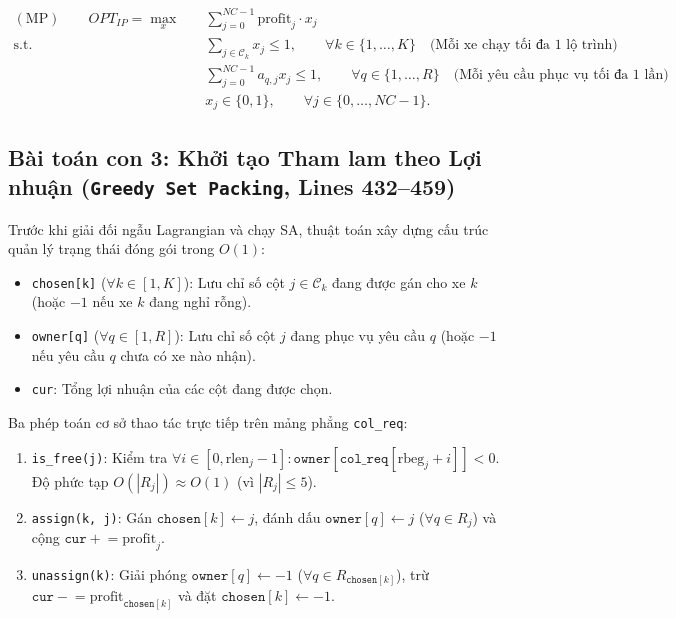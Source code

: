 \documentclass[11pt,a4paper]{article}
\theoremstyle{definition}
\begin{document}
\begin{align}
    (\text{MP}) \qquad OPT_{IP} = \max_{x} \quad & \sum_{j=0}^{NC-1} \text{profit}_j \cdot x_j \label{eq:mp_obj}\\
    \text{s.t.} \quad & \sum_{j \in \mathcal{C}_k} x_j \le 1, \qquad \forall k \in \{1, \dots, K\} \quad \text{(Mỗi xe chạy tối đa 1 lộ trình)} \label{eq:mp_veh}\\
    & \sum_{j=0}^{NC-1} a_{q, j} x_j \le 1, \qquad \forall q \in \{1, \dots, R\} \quad \text{(Mỗi yêu cầu phục vụ tối đa 1 lần)} \label{eq:mp_req}\\
    & x_j \in \{0, 1\}, \qquad \forall j \in \{0, \dots, NC-1\}. \label{eq:mp_bin}
\end{align}

\subsection{Bài toán con 3: Khởi tạo Tham lam theo Lợi nhuận (\texttt{Greedy Set Packing}, Lines 432--459)}
Trước khi giải đối ngẫu Lagrangian và chạy SA, thuật toán xây dựng cấu trúc quản lý trạng thái đóng gói trong $O(1)$:
\begin{itemize}[leftmargin=1.5em]
    \item \texttt{chosen[k]} ($\forall k \in [1, K]$): Lưu chỉ số cột $j \in \mathcal{C}_k$ đang được gán cho xe $k$ (hoặc $-1$ nếu xe $k$ đang nghỉ rỗng).
    \item \texttt{owner[q]} ($\forall q \in [1, R]$): Lưu chỉ số cột $j$ đang phục vụ yêu cầu $q$ (hoặc $-1$ nếu yêu cầu $q$ chưa có xe nào nhận).
    \item \texttt{cur}: Tổng lợi nhuận của các cột đang được chọn.
\end{itemize}
Ba phép toán cơ sở thao tác trực tiếp trên mảng phẳng \texttt{col\_req}:
\begin{enumerate}[leftmargin=1.5em]
    \item \texttt{is\_free(j)}: Kiểm tra $\forall i \in [0, \text{rlen}_j - 1]: \texttt{owner}[\texttt{col\_req}[\text{rbeg}_j + i]] < 0$. Độ phức tạp $O(|R_j|) \approx O(1)$ (vì $|R_j| \le 5$).
    \item \texttt{assign(k, j)}: Gán $\texttt{chosen}[k] \leftarrow j$, đánh dấu $\texttt{owner}[q] \leftarrow j$ ($\forall q \in R_j$) và cộng $\texttt{cur} \mathrel{+}= \text{profit}_j$.
    \item \texttt{unassign(k)}: Giải phóng $\texttt{owner}[q] \leftarrow -1$ ($\forall q \in R_{\texttt{chosen}[k]}$), trừ $\texttt{cur} \mathrel{-}= \text{profit}_{\texttt{chosen}[k]}$ và đặt $\texttt{chosen}[k] \leftarrow -1$.
\end{enumerate}
\end{document}
